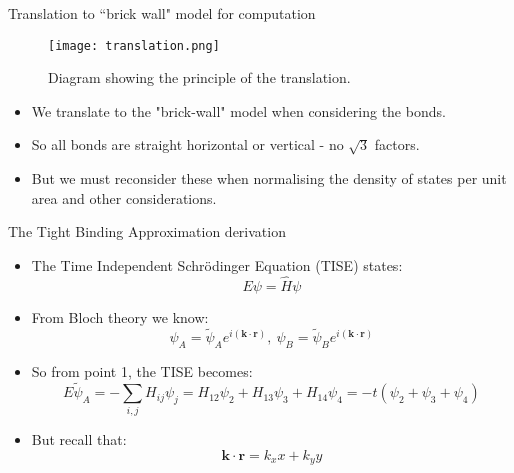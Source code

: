 \documentclass{beamer}
\begin{document}
\begin{frame}[t]{Translation to ``brick wall" model for computation}
\begin{figure}[c]
\texttt{[image: translation.png]}
\caption{Diagram showing the principle of the translation.}
\end{figure}
\begin{itemize}
\item We translate to the "brick-wall" model when considering the bonds.
\item So all bonds are straight horizontal or vertical - no $\sqrt{3}$ factors.
\item But we must reconsider these when normalising the density of states per unit area and other considerations.
\end{itemize}
\end{frame}

\begin{frame}[t]{The Tight Binding Approximation derivation}
\begin{itemize}
\item The Time Independent Schr\"{o}dinger Equation (TISE) states:
\begin{equation}
E\psi = \hat{H} \psi 
\end{equation}
\item From Bloch theory we know:
\begin{equation}
\psi_A = \tilde \psi_A e^{i(\mathbf{k} \cdot \mathbf{r})}, ~ \psi_B = \tilde \psi_B e^{i(\mathbf{k} \cdot \mathbf{r})}
\end{equation}
\item So from point 1, the TISE becomes:
\begin{equation}
E \tilde\psi_A = - \sum_{i,j}H_{ij}\psi_{j} = H_{12}\psi_2 + H_{13}\psi_3 + H_{14}\psi_4 = -t(\psi_2 + \psi_3 + \psi_4)
\end{equation}
\item But recall that:
\begin{equation}
\mathbf{k} \cdot \mathbf{r} = k_x x + k_y y
\end{equation}
\end{itemize}
\end{frame}
\end{document}
